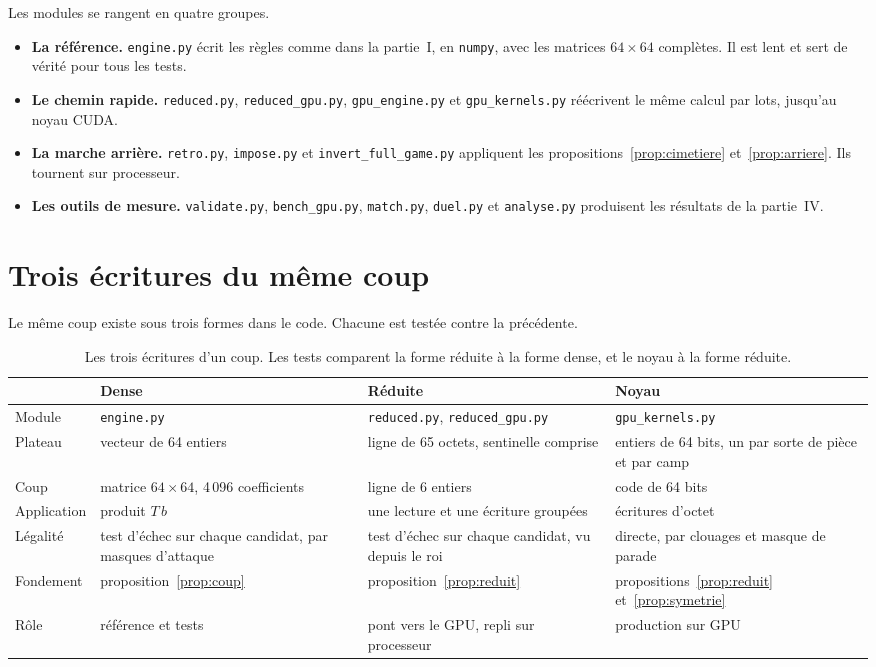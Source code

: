 \documentclass[11pt,a4paper]{article}
\newcommand{\code}[1]{\texttt{#1}}
\newcounter{calcul}
\theoremstyle{plain}
\begin{document}
Les modules se rangent en quatre groupes.
\begin{itemize}
\item \textbf{La référence.} \code{engine.py} écrit les règles comme dans la partie~I, en
\code{numpy}, avec les matrices $64\times64$ complètes. Il est lent et sert de vérité pour tous
les tests.
\item \textbf{Le chemin rapide.} \code{reduced.py}, \code{reduced\_gpu.py}, \code{gpu\_engine.py}
et \code{gpu\_kernels.py} réécrivent le même calcul par lots, jusqu'au noyau CUDA.
\item \textbf{La marche arrière.} \code{retro.py}, \code{impose.py} et
\code{invert\_full\_game.py} appliquent les propositions~\ref{prop:cimetiere}
et~\ref{prop:arriere}. Ils tournent sur processeur.
\item \textbf{Les outils de mesure.} \code{validate.py}, \code{bench\_gpu.py}, \code{match.py},
\code{duel.py} et \code{analyse.py} produisent les résultats de la partie~IV.
\end{itemize}

\section{Trois écritures du même coup}

Le même coup existe sous trois formes dans le code. Chacune est testée contre la précédente.

\begin{table}[H]
\centering\small
\begin{tabular}{>{\raggedright\arraybackslash}p{2.5cm}>{\raggedright\arraybackslash}p{3.9cm}>{\raggedright\arraybackslash}p{3.9cm}>{\raggedright\arraybackslash}p{3.9cm}}
\toprule
 & Dense & Réduite & Noyau\\
\midrule
Module & \code{engine.py} & \code{reduced.py}, \code{reduced\_gpu.py} & \code{gpu\_kernels.py}\\
Plateau & vecteur de 64 entiers & ligne de 65 octets, sentinelle comprise & 12 entiers de 64
bits, un par sorte de pièce et par camp\\
Coup & matrice $64\times64$, 4\,096 coefficients & ligne de 6 entiers & code de 64 bits\\
Application & produit $T\,b$ & une lecture et une écriture groupées & 5 écritures d'octet\\
Légalité & test d'échec sur chaque candidat, par masques d'attaque & test d'échec sur chaque
candidat, vu depuis le roi & directe, par clouages et masque de parade\\
Fondement & proposition~\ref{prop:coup} & proposition~\ref{prop:reduit} &
propositions~\ref{prop:reduit} et~\ref{prop:symetrie}\\
Rôle & référence et tests & pont vers le GPU, repli sur processeur & production sur GPU\\
\bottomrule
\end{tabular}
\caption{Les trois écritures d'un coup. Les tests comparent la forme réduite à la forme dense,
et le noyau à la forme réduite.}
\end{table}
\end{document}
